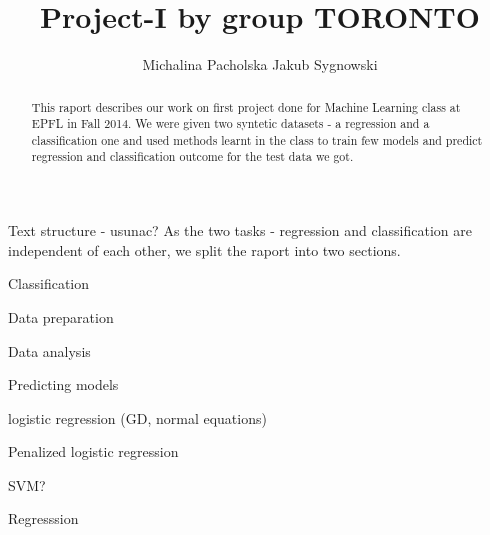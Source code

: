 \documentclass{article}
\title{Project-I by group TORONTO}
\author{Michalina Pacholska \AND Jakub Sygnowski}
\begin{document}
\maketitle
\begin{abstract}
    This raport describes our work on first project done for Machine Learning class at EPFL in Fall 2014. We were given two syntetic datasets - a regression and a classification one and used methods learnt in the class to train few models and predict regression and classification outcome for the test data we got. 
\end{abstract}
\begin{section}{Text structure - usunac?}
As the two tasks - regression and classification are independent of each other, we split the raport into two sections.
\end{section}

\begin{section}{Classification}
\begin{subsection}{Data preparation}
\end{subsection}
\begin{subsection}{Data analysis}
\end{subsection}
\begin{subsection}{Predicting models}
\begin{subsubsection}{logistic regression (GD, normal equations)}
\end{subsubsection}
\begin{subsubsection}{Penalized logistic regression}
\end{subsubsection}
\begin{subsubsection}{SVM?}
\end{subsubsection}
\end{subsection}
\end{section}

\begin{section}{Regresssion}
\end{section}
\end{document}
